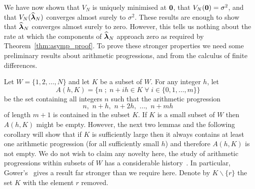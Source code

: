 \documentclass[aap]{imsart}
\newcommand{\prob}{\operatorname{Pr}}
\renewcommand{\mid}{\; ; \;}
\newtheorem{lemma}{Lemma}
\begin{document}

We have now shown that $V_N$ is uniquely minimised at $\boldsymbol{0}$, that $V_N(\boldsymbol{0}) = \sigma^2$, and that $V_N(\widehat{\boldsymbol{\lambda}}_N)$ converges almost surely to $\sigma^2$.  These results are enough to show that $\widehat{\boldsymbol{\lambda}}_N$ converges almost surely to zero.  However, this tells us nothing about the rate at which the components of $\widehat{\boldsymbol{\lambda}}_N$ approach zero as required by Theorem~\ref{thm:asymp_proof}.  To prove these stronger properties we need some preliminary results about arithmetic progressions, and from the calculus of finite differences.
 
Let $W = \{1,2,\dots, N\}$ and let $K$ be a subset of $W$.  For any integer $h$, let
\begin{equation} \label{eq:S(h,G)def} 
A(h,K) = \big\{ n \mid n + ih \in K \;\forall\; i \in \{0,1,\dots,m\} \big\}
\end{equation}
be the set containing all integers $n$ such that the arithmetic progression
\[
n, \,\, n + h, \,\, n + 2h, \,\, \dots, \,\, n + mh
\]
of length $m+1$ is contained in the subset $K$.  If $K$ is a small subset of $W$ then $A(h,K)$ might be empty. However, the next two lemmas and the following corollary will show that if $K$ is sufficiently large then it always contains at least one arithmetic progression (for all sufficiently small $h$) and therefore $A(h,K)$ is not empty. We do not wish to claim any novelty here, the study of arithmetic progressions within subsets of $W$ has a considerable history~\cite{Erdos_on_some_sequence_of_integers1936,Szemeredi_setint_no_k_arth1975,Gowers_new_proof2001}.  In particular, Gower's~\cite[Theorem 1.3]{Gowers_new_proof2001} gives a result far stronger than we require here.  Denote by $K \backslash \{r\}$ the set $K$ with the element $r$ removed.
\end{document}
